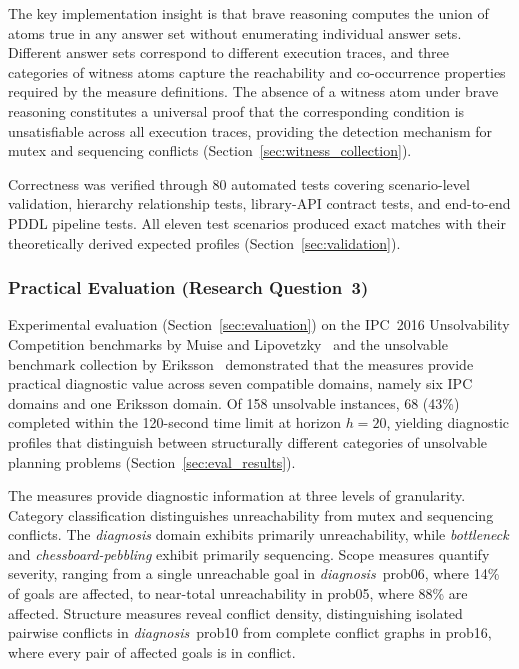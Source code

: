 The key implementation insight is that brave reasoning computes the union of atoms true in any answer set without enumerating individual answer sets. Different answer sets correspond to different execution traces, and three categories of witness atoms capture the reachability and co-occurrence properties required by the measure definitions. The absence of a witness atom under brave reasoning constitutes a universal proof that the corresponding condition is unsatisfiable across all execution traces, providing the detection mechanism for mutex and sequencing conflicts (Section~\ref{sec:witness_collection}).

Correctness was verified through 80 automated tests covering scenario-level validation, hierarchy relationship tests, library-\ac{API} contract tests, and end-to-end \ac{PDDL} pipeline tests. All eleven test scenarios produced exact matches with their theoretically derived expected profiles (Section~\ref{sec:validation}).

\subsubsection{Practical Evaluation (Research Question~3)}

Experimental evaluation (Section~\ref{sec:evaluation}) on the \ac{IPC}~2016 Unsolvability Competition \linebreak benchmarks by Muise and Lipovetzky~\cite{Muise2016} and the unsolvable benchmark collection by Eriksson~\cite{Eriksson2019} demonstrated that the measures provide practical diagnostic value across seven compatible domains, namely six \ac{IPC} domains and one Eriksson domain. Of 158 unsolvable instances, 68 (43\%) completed within the 120-second time limit at horizon $h = 20$, yielding diagnostic profiles that distinguish between structurally different categories of unsolvable planning problems (Section~\ref{sec:eval_results}).

The measures provide diagnostic information at three levels of granularity. Category classification distinguishes unreachability from mutex and sequencing conflicts. The \textit{diagnosis} domain exhibits primarily unreachability, while \textit{bottleneck} and \textit{chessboard-pebbling} exhibit primarily sequencing. Scope measures quantify severity, ranging from a single unreachable goal in \textit{diagnosis}~prob06, where 14\% of goals are affected, to near-total unreachability in prob05, where 88\% are affected. Structure measures reveal conflict density, distinguishing isolated pairwise conflicts in \textit{diagnosis}~prob10 from complete conflict graphs in prob16, where every pair of affected goals is in conflict.

